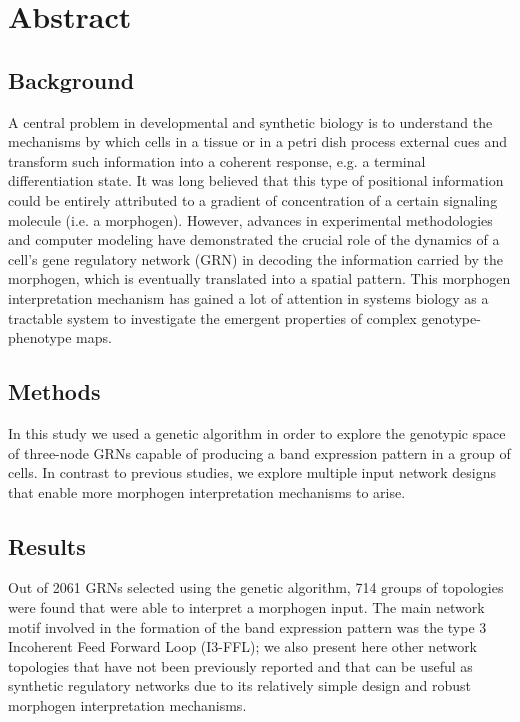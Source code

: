 \documentclass[10pt,letterpaper]{article}
\begin{document}
\section*{Abstract}

\subsection*{Background}
A central problem in developmental and synthetic biology is to understand the 
mechanisms by which cells in a tissue or in a petri dish process external cues 
and transform such information into a coherent response, e.g. a terminal 
differentiation state. It was long believed that this type of positional 
information could be entirely attributed to a gradient of concentration of a 
certain signaling molecule (i.e. a morphogen). However, advances in experimental 
methodologies and computer modeling have demonstrated the crucial role of the 
dynamics of a cell's gene regulatory network (GRN) in decoding the information 
carried by the morphogen, which is eventually translated into a spatial 
pattern. This morphogen interpretation mechanism has gained a lot of attention 
in systems biology as a tractable system to investigate the emergent properties 
of complex genotype-phenotype maps.

\subsection*{Methods}
In this study we used a genetic algorithm in order to explore the genotypic 
space of three-node GRNs capable of producing a band expression pattern in a 
group of cells. In contrast to previous studies, we explore multiple input 
network designs that enable more morphogen interpretation mechanisms to arise.

\subsection*{Results}
Out of 2061 GRNs selected using the genetic algorithm, 714 groups of 
topologies were found that were able to interpret a morphogen input. The 
main network motif involved in the formation of the band expression pattern 
was the type 3 Incoherent Feed Forward Loop (I3-FFL); we also present here 
other network topologies that have not been previously reported and that can 
be useful as synthetic regulatory networks due to its relatively simple design 
and robust morphogen interpretation mechanisms.
\end{document}
